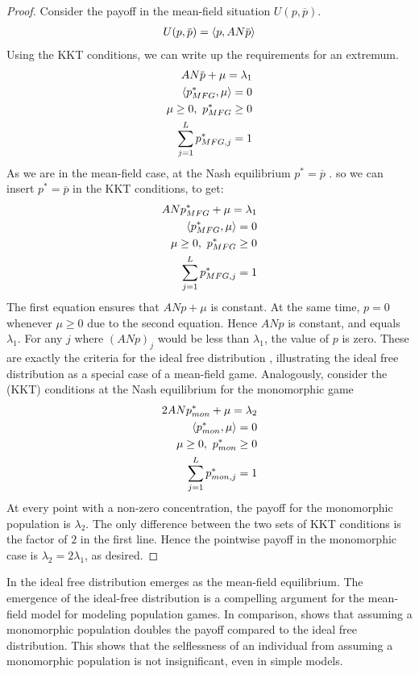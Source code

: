 \begin{proof}
Consider the payoff in the mean-field situation $U(p,\overbar{p})$.
\begin{align}
  U(p, \overbar{p}) = \ip{p}{AN \overbar{p}}
\end{align}
Using the KKT conditions, we can write up the requirements for an extremum.
\begin{equation}
  \begin{split}
    AN \overbar{p} + \mu = \lambda_1 \\
    \ip{p^*_{MFG}}{\mu} = 0 \\
    \mu \geq 0,~p^*_{MFG} \geq 0 \\
    \sum_{j=1}^L p^*_{MFG,j} = 1
  \end{split}
\end{equation}
As we are in the mean-field case, at the Nash equilibrium $p^* = \overbar{p}$ .
so we can insert $p^*=\overbar{p}$ in the KKT conditions, to get:
\begin{equation}
  \begin{split}
    AN p_{MFG}^* + \mu =  \lambda_1 \\
    \left \langle p^*_{MFG},\mu \right \rangle = 0 \\
    \mu \geq 0,~p^*_{MFG} \geq 0 \\
    \sum_{j=1}^L p^*_{MFG,j} = 1
  \end{split}
\end{equation}
The first equation ensures that $AN p + \mu$ is constant. At the same time, $p=0$ whenever $\mu \geq 0$ due to the second equation. Hence $AN p$ is constant, and equals $\lambda_1$. For any $j$ where $(ANp)_j$ would be less than $\lambda_1$, the value of $p$ is zero.
These are exactly the criteria for the ideal free distribution \citep{fretwell1969territorial}, illustrating the ideal free distribution as a special case of a mean-field game.
Analogously, consider the (KKT) conditions at the Nash equilibrium for the monomorphic game
\begin{equation}
  \begin{split}
    2ANp^*_{mon} + \mu = \lambda_2  \\
    \left \langle p^*_{mon},\mu \right \rangle = 0 \\
    \mu \geq 0,~p_{mon}^* \geq 0 \\
    \sum_{j=1}^L p^*_{mon,j} = 1
  \end{split}
\end{equation}
At every point with a non-zero concentration, the payoff for the monomorphic population is $\lambda_2$. The only difference between the two sets of KKT conditions is the factor of $2$ in the first line. Hence the pointwise payoff in the monomorphic case is $\lambda_2 = 2\lambda_1$, as desired.
\end{proof}


In  the ideal free distribution emerges as the mean-field equilibrium. The emergence of the ideal-free distribution is a compelling argument for the mean-field model for modeling population games. In comparison,  shows that assuming a monomorphic population doubles the payoff compared to the ideal free distribution. This shows that the selflessness of an individual from assuming a monomorphic population is not insignificant, even in simple models.
